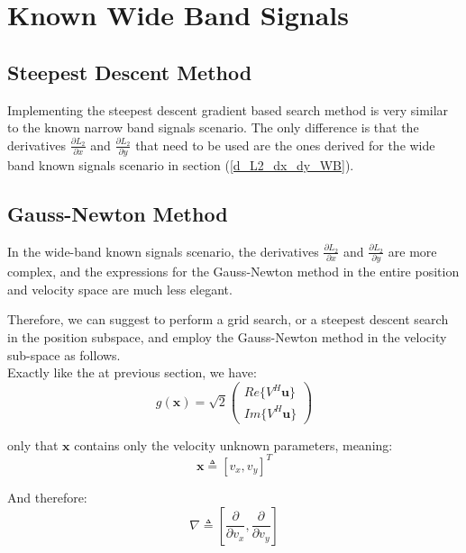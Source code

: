 \documentclass[10pt,a4paper]{report}
\begin{document}
\section{Known Wide Band Signals}

\subsection{Steepest Descent Method}

Implementing the steepest descent gradient based search method is very similar to the known narrow band signals scenario. The only difference is that the derivatives $\frac{\partial L_2}{\partial x}$ and $\frac{\partial L_2}{\partial y}$ that need to be used are the ones derived for the wide band known signals scenario in section (\ref{d_L2_dx_dy_WB}).

\subsection{Gauss-Newton Method}

In the wide-band known signals scenario, the derivatives $\frac{\partial L_2}{\partial x}$ and $\frac{\partial L_2}{\partial y}$ are more complex, and the expressions for the Gauss-Newton method in the entire position and velocity space are much less elegant.

Therefore, we can suggest to perform a grid search, or a steepest descent search in the position subspace, and employ the Gauss-Newton method in the velocity sub-space as follows.\\

Exactly like the at previous section, we have:
\begin{equation}
g(\mathbf{x})=\sqrt{2} \begin{pmatrix} Re\{V^H \mathbf{u}\} \\Im\{V^H \mathbf{u}\} \end{pmatrix}
\end{equation}

only that $\mathbf{x}$ contains only the velocity unknown parameters, meaning: 
\begin{equation}
\mathbf{x} \triangleq \left[ v_x, v_y \right]^T
\end{equation}

And therefore:
\begin{equation}
\nabla \triangleq \left[\frac{\partial}{\partial v_x},
\frac{\partial}{\partial v_y}\right]
\end{equation}
\end{document}
